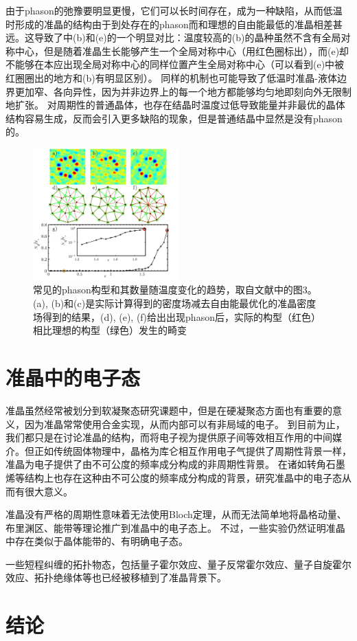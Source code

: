 \documentclass[hyperref, UTF8, a4paper]{ctexart}
\begin{document}
由于phason的弛豫要明显更慢，它们可以长时间存在\cite{PhysRevB.32.7444}，成为一种缺陷，从而低温时形成的准晶的结构由于到处存在的phason而和理想的自由能最低的准晶相差甚远。这导致了中(b)和(e)的一个明显对比：温度较高的(b)的晶种虽然不含有全局对称中心，但是随着准晶生长能够产生一个全局对称中心（用红色圈标出），而(e)却不能够在本应出现全局对称中心的同样位置产生全局对称中心（可以看到(e)中被红圈圈出的地方和(b)有明显区别）。
同样的机制也可能导致了低温时准晶-液体边界更加窄、各向异性，因为并非边界上的每一个地方都能够均匀地即刻向外无限制地扩张。
对周期性的普通晶体，也存在结晶时温度过低导致能量并非最优的晶体结构容易生成，反而会引入更多缺陷的现象\cite{2018fox}，但是普通结晶中显然是没有phason的。

\begin{figure}
    \centering
    \includegraphics[width=0.5\textwidth]{phason.png}
    \caption{常见的phason构型和其数量随温度变化的趋势，取自文献\cite{PhysRevLett.112.255501}中的图3。(a), (b)和(c)是实际计算得到的密度场减去自由能最优化的准晶密度场得到的结果，(d), (e), (f)给出出现phason后，实际的构型（红色）相比理想的构型（绿色）发生的畸变}
\end{figure}

\section{准晶中的电子态}

准晶虽然经常被划分到软凝聚态研究课题中，但是在硬凝聚态方面也有重要的意义，因为准晶常常使用合金实现，从而内部可以有非局域的电子。
到目前为止，我们都只是在讨论准晶的结构，而将电子视为提供原子间等效相互作用的中间媒介。但正如传统固体物理中，晶格为库仑相互作用电子气提供了周期性背景一样，准晶为电子提供了由不可公度的频率成分构成的非周期性背景。
在诸如转角石墨烯等结构上也存在这种由不可公度的频率成分构成的背景，研究准晶中的电子态从而有很大意义。

准晶没有严格的周期性意味着无法使用Bloch定理，从而无法简单地将晶格动量、布里渊区、能带等理论推广到准晶中的电子态上。
不过，一些实验仍然证明准晶中存在类似于晶体能带的、有明确电子态。

一些短程纠缠的拓扑物态，包括量子霍尔效应、量子反常霍尔效应、量子自旋霍尔效应、拓扑绝缘体等也已经被移植到了准晶背景下\cite{topo2021}。

\section{结论}


 
\end{document}
